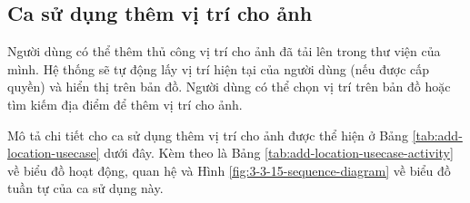 \subsection{Ca sử dụng thêm vị trí cho ảnh}

Người dùng có thể thêm thủ công vị trí cho ảnh đã tải lên trong thư viện của mình. Hệ thống sẽ tự động lấy vị trí hiện tại của người dùng (nếu được cấp quyền) và hiển thị trên bản đồ. Người dùng có thể chọn vị trí trên bản đồ hoặc tìm kiếm địa điểm để thêm vị trí cho ảnh.

Mô tả chi tiết cho ca sử dụng thêm vị trí cho ảnh được thể hiện ở Bảng \ref{tab:add-location-usecase} dưới đây. Kèm theo là Bảng \ref{tab:add-location-usecase-activity} về biểu đồ hoạt động, quan hệ và Hình \ref{fig:3-3-15-sequence-diagram} về biểu đồ tuần tự của ca sử dụng này. 

